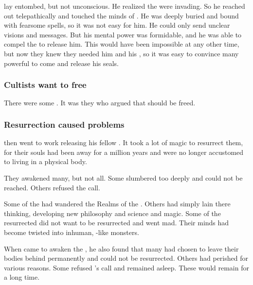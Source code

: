 \Sethicus lay entombed, but not unconscious.
He realized the \banes were invading.
So he reached out telepathically and touched the minds of \ophidians.
He was deeply buried and bound with fearsome spells, so it was not easy for him.
He could only send unclear visions and messages.
But his mental power was formidable, and he was able to compel the \ophidians to release him.
This would have been impossible at any other time, but now they knew they needed him and his \dragons, so it was easy to convince many powerful \ophidians to come and release his seals.





\subsubsection{Cultists want to free \Sethicus}
There were some . 
It was they who argued that \Sethicus should be freed. 





\subsubsection{Resurrection caused problems}
\Sethicus then went to work releasing his fellow \dragons.
It took a lot of magic to resurrect them, for their souls had been away for a million years and were no longer accustomed to living in a physical body.

They awakened many, but not all.
Some slumbered too deeply and could not be reached.
Others refused the call.

Some of the \dragons had wandered the Realms of the \xss. 
Others had simply lain there thinking, developing new philosophy and science and magic.
Some of the resurrected \dragons did not want to be resurrected and went mad.
Their minds had become twisted into inhuman, \xs-like monsters.


When \Sethicus came to awaken the \dragons, he also found that many had chosen to leave their bodies behind permanently and could not be resurrected.
Others had perished for various reasons.
Some refused \Sethicus's call and remained asleep. 
These would remain  for a long time. 





